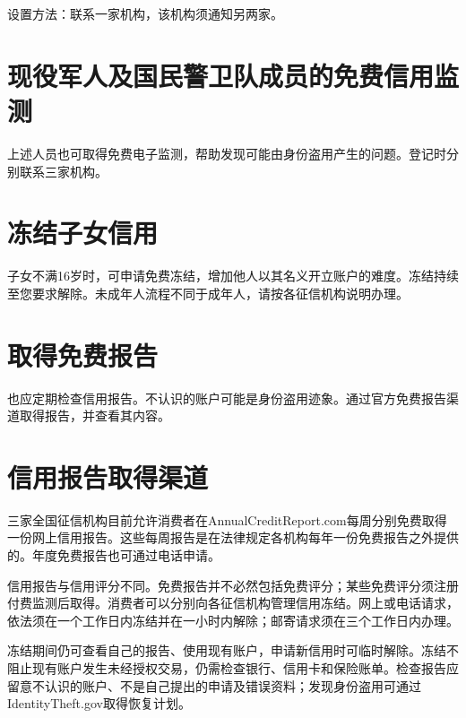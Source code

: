\documentclass[UTF8,fontset=none,11pt,a4paper]{ctexart}
\begin{document}
设置方法：联系一家机构，该机构须通知另两家。


\section*{现役军人及国民警卫队成员的免费信用监测}
上述人员也可取得免费电子监测，帮助发现可能由身份盗用产生的问题。登记时分别联系三家机构。


\section*{冻结子女信用}
子女不满16岁时，可申请免费冻结，增加他人以其名义开立账户的难度。冻结持续至您要求解除。未成年人流程不同于成年人，请按各征信机构说明办理。


\section*{取得免费报告}
也应定期检查信用报告。不认识的账户可能是身份盗用迹象。通过官方免费报告渠道取得报告，并查看其内容。


\section*{信用报告取得渠道}
三家全国征信机构目前允许消费者在AnnualCreditReport.com每周分别免费取得一份网上信用报告。这些每周报告是在法律规定各机构每年一份免费报告之外提供的。年度免费报告也可通过电话申请。


信用报告与信用评分不同。免费报告并不必然包括免费评分；某些免费评分须注册付费监测后取得。消费者可以分别向各征信机构管理信用冻结。网上或电话请求，依法须在一个工作日内冻结并在一小时内解除；邮寄请求须在三个工作日内办理。


冻结期间仍可查看自己的报告、使用现有账户，申请新信用时可临时解除。冻结不阻止现有账户发生未经授权交易，仍需检查银行、信用卡和保险账单。检查报告应留意不认识的账户、不是自己提出的申请及错误资料；发现身份盗用可通过IdentityTheft.gov取得恢复计划。
\end{document}
